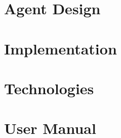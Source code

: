 \section{Agent Design} \label{section:agent-design}

\section{Implementation} \label{section:implementation}

\section{Technologies} \label{section:technologies}

\section{User Manual} \label{section:user-manual}
